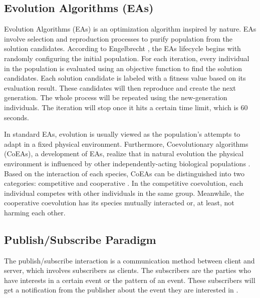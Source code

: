 \documentclass[conference]{IEEEtran}
\begin{document}
\subsection{Evolution Algorithms (EAs)}
\label{ssec:evolution-algorithms}
Evolution Algorithms (EAs) is an optimization algorithm inspired by nature. EAs involve selection and reproduction processes to purify population from the solution candidates. According to Engelbrecht \cite{engelbrecht_coevolution_2007}, the EAs lifecycle begins with randomly configuring the initial population. For each iteration, every individual in the population is evaluated using an objective function to find the solution candidates. Each solution candidate is labeled with a fitness value based on its evaluation result. These candidates will then reproduce and create the next generation. The whole process will be repeated using the new-generation individuals. The iteration will stop once it hits a certain time limit, which is 60 seconds. 


In standard EAs, evolution is usually viewed as the population's attempts to adapt in a fixed physical environment. Furthermore, Coevolutionary algorithms (CoEAs), a development of EAs, realize that in natural evolution the physical environment is influenced by other independently-acting biological populations \cite{engelbrecht_coevolution_2007}. Based on the interaction of each species, CoEAs can be distinguished into two categories: competitive and cooperative \cite{engelbrecht_coevolution_2007}. In the competitive coevolution, each individual competes with other individuals in the same group. Meanwhile, the cooperative coevolution has its species mutually interacted or, at least, not harming each other. 


\subsection{Publish/Subscribe Paradigm}
\label{ssec:pub-sub}
The publish/subscribe interaction is a communication method between client and server, which involves subscribers as clients. The subscribers are the parties who have interests in a certain event or the pattern of an event. These subscribers will get a notification from the publisher about the event they are interested in \cite{eugster_many_2003}. 
\end{document}

